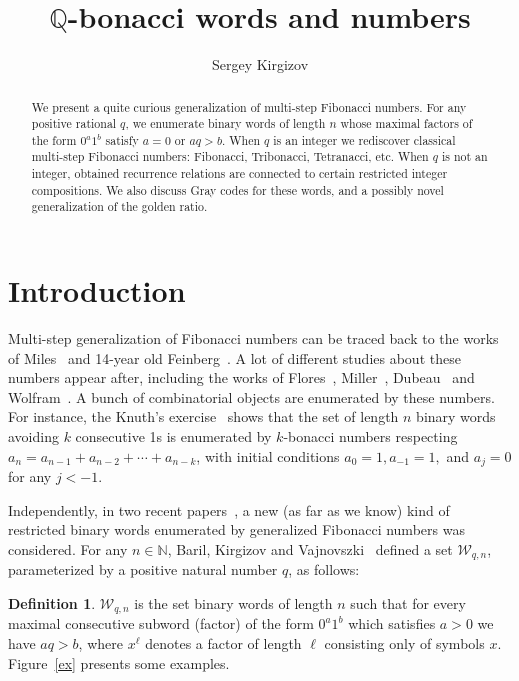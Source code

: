 \documentclass[a4paper,12pt]{article}
\author{Sergey Kirgizov}
\affil{\rm LIB, Université de Bourgogne Franche-Comté\protect\\
  B.P. 47 870, 21078 Dijon Cedex France\protect\\
   {\tt E-mail: sergey.kirgizov@u-bourgogne.fr  }
}
\title{$\mathbb{Q}$-bonacci words and numbers}
\theoremstyle{definition}
\newtheorem{definition}{Definition}
\newcommand{\W}{\mathcal{W}}
\newcommand{\N}{\mathbb{N}}
\begin{document}
\maketitle

\begin{abstract}
  We present a quite curious generalization of multi-step Fibonacci
  numbers.  For any positive rational $q$, we enumerate binary words
  of length $n$ whose maximal factors of the form $0^a1^b$ satisfy $a
  = 0$ or $aq > b$.  When $q$ is an integer we rediscover classical
  multi-step Fibonacci numbers: Fibonacci, Tribonacci, Tetranacci,
  etc.  When $q$ is not an integer, obtained recurrence relations are
  connected to certain restricted integer compositions.  We also
  discuss Gray codes for these words, and a possibly novel
  generalization of the golden ratio.
\end{abstract}


\section{Introduction}

Multi-step generalization of Fibonacci numbers can be traced back to
the works of Miles~\cite{miles} and 14-year old Feinberg~\cite{fei}. A
lot of different studies about these numbers appear after, including
the works of Flores~\cite{flores}, Miller~\cite{miller},
Dubeau~\cite{dubeau} and Wolfram~\cite{wolf}. A bunch of combinatorial
objects are enumerated by these numbers. For instance, the Knuth's
exercise~\cite[p. 286]{knuth3} shows that the set of length $n$ binary
words avoiding $k$ consecutive 1s is enumerated by $k$-bonacci numbers
respecting $a_n = a_{n-1} + a_{n-2} + \cdots + a_{n-k}$, with initial
conditions $a_0 = 1, a_{-1} = 1,$ and $a_j = 0$ for any $j < -1$.

Independently, in two recent papers~\cite{ourfibo, EI}, a new (as far
as we know) kind of restricted binary words enumerated by generalized
Fibonacci numbers was considered. For any $n \in \N$, Baril, Kirgizov
and Vajnovszki~\cite{ourfibo} defined a set $\W_{q,n}$, parameterized
by a positive natural number $q$, as follows:

\begin{definition}
  $\W_{q,n}$ is the set binary words of length $n$ such that for every
  maximal consecutive subword (factor) of the form $0^a1^b$ which
  satisfies $a > 0$ we have $aq > b$, where $x^\ell$ denotes a factor
  of length $\ell$ consisting only of symbols $x$. Figure~\ref{ex}
  presents some examples.
\label{q}
\end{definition}
\end{document}
